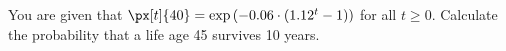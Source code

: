 You are given that $\px[t]{40}=\exp\left(-0.06\cdot (1.12^t-1)\right)$ for all $t\geq 0$. 
Calculate the probability that a life age 45 survives 10 years.
